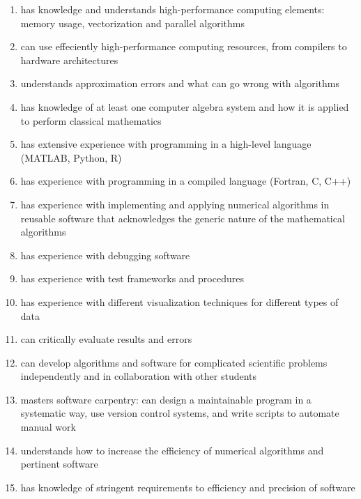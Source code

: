 \documentclass[%
oneside,                 %
final,                   %
10pt]{article}
\begin{document}
\begin{itemize}
\begin{itemize}
\begin{enumerate}
 \item has knowledge and understands high-performance computing elements: memory usage, vectorization and parallel algorithms

 \item can use effeciently high-performance computing resources, from compilers to hardware architectures

 \item understands approximation errors and what can go wrong with algorithms

 \item has knowledge of at least one computer algebra system and how it is applied to perform classical mathematics

 \item has extensive experience with programming in a high-level language (MATLAB, Python, R)

 \item has experience with programming in a compiled language (Fortran, C, C++)

 \item has experience with implementing and applying numerical algorithms in reusable software that acknowledges the generic nature of the mathematical algorithms

\item has experience with debugging software

\item has experience with test frameworks and procedures

\item has experience with different visualization techniques for different types of data

\item can critically evaluate results and errors

\item can develop algorithms and software for complicated scientific problems independently and in collaboration with other students

\item masters software carpentry: can design a maintainable program in a systematic way, use version control systems, and write scripts to automate manual work

\item understands how to increase the efficiency of numerical algorithms and pertinent software

\item has knowledge of stringent requirements to efficiency and precision of software


\end{enumerate}
\end{itemize}
\end{itemize}
\end{document}

